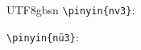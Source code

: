 \documentclass{article}
\begin{document}
\begin{CJK}{UTF8}{gbsn}
\verb|\pinyin{nv3}|: \par
\verb|\pinyin{nü3}|: \par
\end{CJK}
\end{document}
